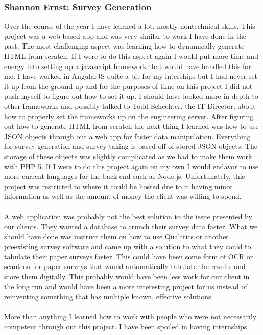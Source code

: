 \documentclass[../final.tex]{subfiles}
\begin{document}
\subsubsection{Shannon Ernst: Survey Generation}
Over the course of the year I have learned a lot, mostly 
nontechnical skills. This project was a web based app and 
was very similar to work I have done in the past. The most 
challenging aspect was learning how to dynamically generate 
HTML from scratch. If I were to do this aspect again I would 
put more time and energy into setting up a javascript framework 
that would have handled this for me. I have worked in AngularJS 
quite a bit for my interships but I had never set it up from 
the ground up and for the purposes of time on this project I did 
not push myself to figure out how to set it up. I should have looked 
more in depth to other frameworks and possibly talked to Todd Schechter,
 the IT Director, about how to properly set the frameworks up on 
 the engineering server. After figuring out how to generate HTML 
from scratch the next thing I learned was how to use JSON objects 
through out a web app for faster data manipulation. Everything for 
survey generation and survey taking is based off of stored JSON objects.
The storage of these objects was slightly complicated as we had to make 
them work with PHP 5. If I were to do this project again on my own I would 
endavor to use more current languages for the back end such as Node.js. 
Unfortunately, this project was restricted to where it could be hosted 
due to it having minor information as well as the amount of money the 
client was willing to spend. \\\\
A web application was probably not the best solution to the issue 
presented by our clients. They wanted a database to crunch their survey 
data faster. What we should have done was instruct them on how to use 
Qualtrics or another preexisting survey software and came up with a 
solution to what they could to tabulate their paper surveys faster. This 
could have been some form of OCR or scantron for paper surveys that would 
automatically tabulate the results and store them digitally. This probably 
would have been less work for our client in the long run and would have 
been a more interesting project for us instead of reinventing something that 
has multiple known, effective solutions. \\\\
More than anything I learned how to work with people who were not necessarily 
competent through out this project. I have been spoiled in having internships 
\end{document}
